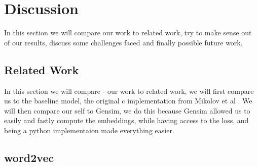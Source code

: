 \chapter{Discussion}\label{chap:discussion}



In this section we will compare our work to related work, try to make sense out of our results, discuss some challenges faced and finally possible future work. 
\section{Related Work}
In this section we will compare - our work to related work, we will first compare us to the baseline model, the original c implementation from Mikolov et al \cite{Mikolov}. We will then compare our self to Gensim, we do this because Gensim allowed us to easily and fastly compute the embeddings, while having access to the loss, and being a python implementaion made everything easier. 

\section{word2vec}

